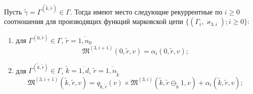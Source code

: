 \documentclass[a4paper,12pt,russian]{extarticle}
\newcommand{\MarkThree}{\{(\Gamma_i, \varkappa_{3,i}); i \geqslant 0\}}
\begin{document}
\begin{theorem}
Пусть $\tilde{\gamma}=\Gamma^{(\tilde{k},\tilde{r})} \in \Gamma$. Тогда имеют место следующие рекуррентные по $i \geqslant 0$ соотношения для производящих функций марковской цепи $\MarkThree$:
\begin{enumerate}

\item для $ \Gamma^{(0,\tilde{r})} \in \Gamma$, $\tilde{r} = \overline{1,n_0}$ 
$$
\mathfrak{M}^{(3,i+1)}(0,\tilde{r},v) = \alpha_i(0,\tilde{r},v);
$$
\item для $\Gamma^{(\tilde{k},\tilde{r})} \in \Gamma $, $\tilde{k} =\overline{1,d}$, $\tilde{r}=\overline{1,n_{\tilde{k}}}$
$$
\mathfrak{M}^{(3,i+1)}(\tilde{k},\tilde{r},v) = q_{\tilde{k},\tilde{r}} (v)\times  \mathfrak{M}^{(3,i)}(\tilde{k},\tilde{r} \ominus_{\tilde{k}} 1,v) + \alpha_i(\tilde{k},\tilde{r},v);
$$
\end{enumerate}

\label{theorem:gen:rek}
\end{theorem}
\end{document}
